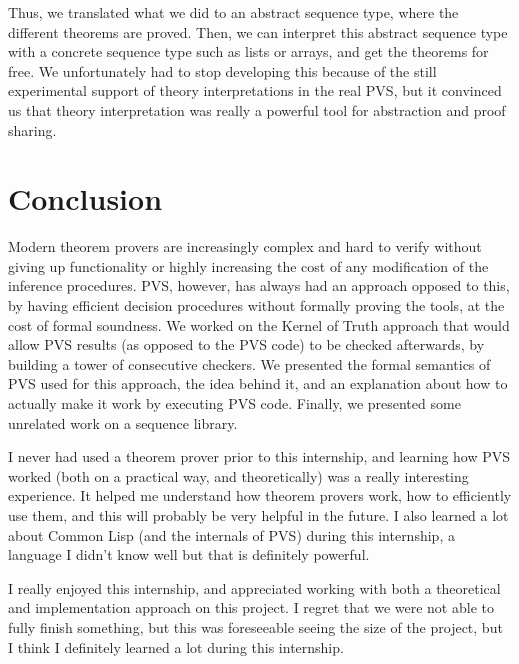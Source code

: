 \documentclass[utf8,a4paper]{article}
\begin{document}
Thus, we translated what we did to an abstract sequence type, where
the different theorems are proved. Then, we can interpret this
abstract sequence type with a concrete sequence type such as lists or
arrays, and get the theorems for free. We unfortunately had to stop
developing this because of the still experimental support of theory
interpretations in the real PVS, but it convinced us that theory
interpretation was really a powerful tool for abstraction and proof
sharing.

\section{Conclusion}

Modern theorem provers are increasingly complex and hard to verify
without giving up functionality or highly increasing the cost of any
modification of the inference procedures. PVS, however, has always had
an approach opposed to this, by having efficient decision procedures
without formally proving the tools, at the cost of formal
soundness. We worked on the Kernel of Truth approach that would allow
PVS results (as opposed to the PVS code) to be checked afterwards, by
building a tower of consecutive checkers. We presented the formal
semantics of PVS used for this approach, the idea behind it, and an
explanation about how to actually make it work by executing PVS
code. Finally, we presented some unrelated work on a sequence library.

I never had used a theorem prover prior to this internship, and
learning how PVS worked (both on a practical way, and theoretically)
was a really interesting experience. It helped me understand how
theorem provers work, how to efficiently use them, and this will
probably be very helpful in the future. I also learned a lot about
Common Lisp (and the internals of PVS) during this internship, a
language I didn't know well but that is definitely powerful.

I really enjoyed this internship, and appreciated working with both a
theoretical and implementation approach on this project. I regret that
we were not able to fully finish something, but this was foreseeable
seeing the size of the project, but I think I definitely learned a lot
during this internship.

\end{document}
